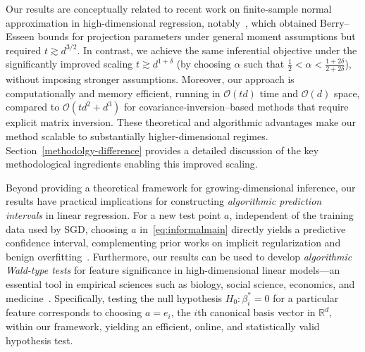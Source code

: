 \documentclass[11pt, reqno,english]{amsart}
\begin{document}
Our results are conceptually related to recent work on finite-sample normal approximation in high-dimensional regression, notably~\cite{chang2023inference}, which obtained Berry–Esseen bounds for projection parameters under general moment assumptions but required $t \gtrsim d^{3/2}$. In contrast, we achieve the same inferential objective under the significantly improved scaling $t \gtrsim d^{1+\delta}$ (by choosing $\alpha$ such that $\frac{1}{2} < \alpha < \frac{1 + 2\delta}{2 + 2\delta}$), without imposing stronger assumptions. Moreover, our approach is computationally and memory efficient, running in $\mathcal{O}(td)$ time and $\mathcal{O}(d)$ space, compared to $\mathcal{O}(td^2 + d^3)$ for covariance-inversion–based methods that require explicit matrix inversion. These theoretical and algorithmic advantages make our method scalable to substantially higher-dimensional regimes. Section~\ref{methodolgy-difference} provides a detailed discussion of the key methodological ingredients enabling this improved scaling.

\vspace{6pt}
Beyond providing a theoretical framework for growing-dimensional inference, our results have practical implications for constructing \emph{algorithmic prediction intervals} in linear regression. For a new test point $a$, independent of the training data used by SGD, choosing $a$ in~\eqref{eq:informalmain} directly yields a predictive confidence interval, complementing prior works on implicit regularization and benign overfitting~\cite{ali2020implicit, varre2021last, zou2021benign, wu2022last, chen2022dimension}. Furthermore, our results can be used to develop \emph{algorithmic Wald-type tests} for feature significance in high-dimensional linear models—an essential tool in empirical sciences such as biology, social science, economics, and medicine~\cite{fang2017testing, shi2019linear, cai2023statistical}. Specifically, testing the null hypothesis $H_0: \beta_i^* = 0$ for a particular feature corresponds to choosing $a = e_i$, the $i$th canonical basis vector in $\mathbb{R}^d$, within our framework, yielding an efficient, online, and statistically valid hypothesis test.


\end{document}
